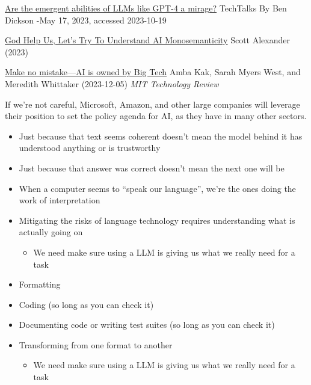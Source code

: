 \documentclass[25pt,a4paper,landscape,headrule,footrule,xetex]{foils}
\let\oldbibliography
\renewcommand{}[1]{
  \begingroup
  \renewcommand{\section}[2]{} %
  \oldbibliography{#1} %
  \endgroup
}
\begin{document}
\href{https://bdtechtalks.com/2023/05/17/llm-emergent-abilities-mirage/}{Are the emergent abilities of LLMs like GPT-4 a mirage?} TechTalks
By Ben Dickson -May 17, 2023, accessed 2023-10-19

\href{https://www.astralcodexten.com/p/god-help-us-lets-try-to-understand}{God Help Us, Let's Try To Understand AI Monosemanticity} Scott Alexander (2023)

\href{https://www.technologyreview.com/2023/12/05/1084393/make-no-mistake-ai-is-owned-by-big-tech/amp/}{Make no mistake—AI is owned by Big Tech}  Amba Kak, Sarah Myers West, and Meredith Whittaker (2023-12-05) \textit{MIT Technology Review}

If we’re not careful, Microsoft, Amazon, and other large companies will leverage their position to set the policy agenda for AI, as they have in many other sectors.





\begin{itemize}
\item  Just because that text seems coherent doesn’t mean the model behind it has
understood anything or is trustworthy
\item  Just because that answer was correct doesn’t mean the next one will be
\item  When a computer seems to “speak our language”, we’re the ones
doing the work of interpretation
\item Mitigating the risks of language technology requires understanding what is actually going on
  \begin{itemize}
  \item We need make sure using a LLM is giving us what we really need for a task
  \end{itemize}
\end{itemize}

\begin{itemize}
\item  Formatting
\item  Coding (so long as you can check it)
\item  Documenting code or writing test suites  (so long as you can check it)
  
\item Transforming from one format to another
  \begin{itemize}
  \item We need make sure using a LLM is giving us what we really need for a task
  \end{itemize}
\end{itemize}





\end{document}
